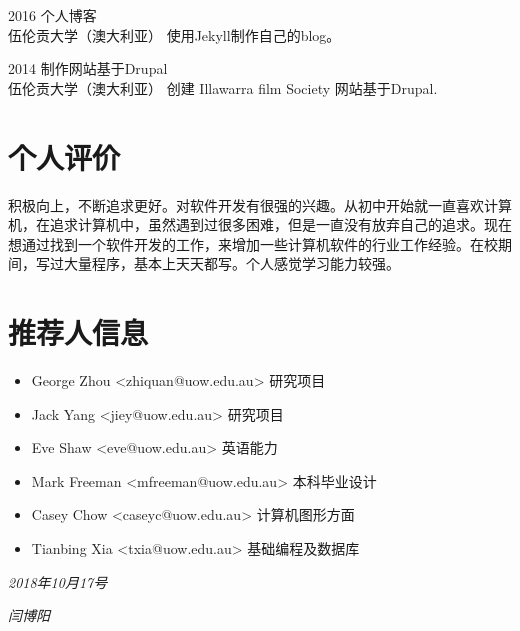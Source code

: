 \documentclass[]{friggeri-cv}
\begin{document}
\begin{entrylist}
  \entry
    {2016}
    {个人博客\\}
    {伍伦贡大学（澳大利亚）}
    {使用Jekyll制作自己的blog。}
\end{entrylist}

\begin{entrylist}
  \entry
    {2014}
    {制作网站基于Drupal\\}
    {伍伦贡大学（澳大利亚）}
    {创建 Illawarra film Society 网站基于Drupal.}
\end{entrylist}

\section{个人评价}
积极向上，不断追求更好。对软件开发有很强的兴趣。从初中开始就一直喜欢计算机，在追求计算机中，虽然遇到过很多困难，但是一直没有放弃自己的追求。现在想通过找到一个软件开发的工作，来增加一些计算机软件的行业工作经验。在校期间，写过大量程序，基本上天天都写。个人感觉学习能力较强。

\section{推荐人信息}
\begin{itemize}
	\item George Zhou <zhiquan@uow.edu.au> 研究项目
	
	\item Jack Yang <jiey@uow.edu.au> 研究项目
	
	\item Eve Shaw <eve@uow.edu.au> 英语能力
	
	\item Mark Freeman <mfreeman@uow.edu.au> 本科毕业设计
	
	\item Casey Chow <caseyc@uow.edu.au> 计算机图形方面
	
	\item Tianbing Xia <txia@uow.edu.au> 基础编程及数据库
\end{itemize}



\begin{flushleft}
\emph{2018年10月17号}
\end{flushleft}
\begin{flushright}
\emph{闫博阳}
\end{flushright}

% 
\end{document}
